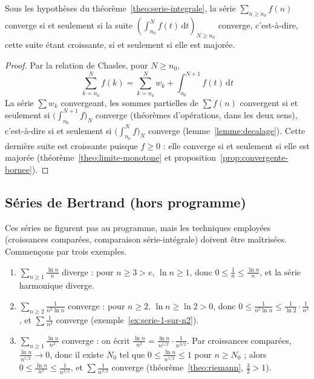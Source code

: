 \begin{coro}
\label{coro:serie-integrale-nature}
Sous les hypothèses du théorème~\ref{theo:serie-integrale}, la série $\sum_{n\geq n_0}f(n)$ converge si et seulement si la suite $\left(\int_{n_0}^{N}f(t)\,\mathrm{d}t\right)_{N\geq n_0}$ converge, c'est-à-dire, cette suite étant croissante, si et seulement si elle est majorée.
\end{coro}

\begin{proof}
Par la relation de Chasles, pour $N\geq n_0$,
\[\sum_{k=n_0}^{N}f(k)=\sum_{k=n_0}^{N}w_k+\int_{n_0}^{N+1}f(t)\,\mathrm{d}t\]
La série $\sum w_k$ convergeant, les sommes partielles de $\sum f(n)$ convergent si et seulement si $\big(\int_{n_0}^{N+1}f\big)_N$ converge (théorèmes d'opérations, dans les deux sens), c'est-à-dire si et seulement si $\big(\int_{n_0}^{N}f\big)_N$ converge (lemme~\ref{lemme:decalage}). Cette dernière suite est croissante puisque $f\geq 0$ : elle converge si et seulement si elle est majorée (théorème~\ref{theo:limite-monotone} et proposition~\ref{prop:convergente-bornee}).
\end{proof}

\subsection{Séries de Bertrand (hors programme)}

Ces séries ne figurent pas au programme, mais les techniques employées (croissances comparées, comparaison série-intégrale) doivent être maîtrisées. Commençons par trois exemples.

\begin{exemple}
\label{ex:bertrand-exemples}
\begin{enumerate}
\item $\sum_{n\geq1}\frac{\ln n}{n}$ diverge : pour $n\geq 3>e$, $\ln n\geq 1$, donc $0\leq\frac1n\leq\frac{\ln n}{n}$, et la série harmonique diverge.
\item $\sum_{n\geq2}\frac{1}{n^2\ln n}$ converge : pour $n\geq 2$, $\ln n\geq\ln 2>0$, donc $0\leq\frac{1}{n^2\ln n}\leq\frac{1}{\ln 2}\cdot\frac{1}{n^2}$, et $\sum\frac{1}{n^2}$ converge (exemple~\ref{ex:serie-1-sur-n2}).
\item $\sum_{n\geq1}\frac{\ln n}{n^2}$ converge : on écrit $\frac{\ln n}{n^2}=\frac{\ln n}{n^{1/2}}\cdot\frac{1}{n^{3/2}}$. Par croissances comparées, $\frac{\ln n}{n^{1/2}}\to 0$, donc il existe $N_0$ tel que $0\leq\frac{\ln n}{n^{1/2}}\leq 1$ pour $n\geq N_0$ ; alors $0\leq\frac{\ln n}{n^2}\leq\frac{1}{n^{3/2}}$, et $\sum\frac{1}{n^{3/2}}$ converge (théorème~\ref{theo:riemann}, $\frac32>1$).
\end{enumerate}
\end{exemple}

